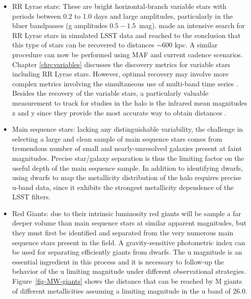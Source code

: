 \begin{itemize}

\item RR Lyrae stars: These are bright horizontal-branch variable stars with
periods between 0.2 to 1.0 days and large amplitudes, particularly in the bluer 
bandpasses (g amplitudes $0.5 - 1.5$~mag). \citet{2012AJ....144....9O} made an intensive
search for RR Lyrae stars in simulated LSST data and reached to the conclusion 
that this type of stars can be recovered to distances $\sim 600$ kpc. A similar procedure
can now be performed using MAF and current cadence scenarios.
Chapter \ref{chp:variables} discusses the discovery metrics for variable stars 
including RR Lyrae stars. However, optimal recovery may involve more complex metrics
involving the simultaneous use of multi-band time series \citep{vanderplas15,vivas16}.
Besides the recovery of the variable stars, a particularly valuable measurement to track 
for studies in the halo is the infrared mean magnitudes z and y since they provide the 
most accurate way to obtain distances \citep{caceres08}. 

\item Main sequence stars: lacking any distinguishable variability, the
challenge in selecting a large and clean sample of main sequence stars comes
from tremendous number of small and nearly-unresolved galaxies present at
faint magnitudes. Precise star/galaxy separation is thus the limiting factor
on the useful depth of the main sequence sample. In addition to identifying
dwarfs, using dwarfs to map the metallicity distribution of the halo requires
precise u-band data, since it exhibits the strongest metallicity dependence of
the LSST filters.

\item Red Giants: due to their intrinsic luminosity red giants will be sample
a far deeper volume than main sequence stars at similar apparent magnitudes,
but they must first be identified and separated from the very numerous main
sequence stars present in the field. A gravity-sensitive photometric index can
be used for separating efficiently giants from dwarfs. The u magnitude
is an essential ingredient in this process and it is necessary to follow-up
the behavior of the u limiting magnitude under different observational
strategies. Figure~\ref{fig-MW-giants} shows the distance that can be reached 
by M giants of different metallicities assuming a limiting magnitude in the u band of
26.0. 

\end{itemize}

